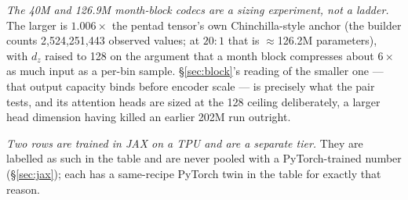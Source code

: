 \documentclass[10pt]{article}
\begin{document}
\emph{The 40M and 126.9M month-block codecs are a sizing experiment, not a
ladder.} The larger is $1.006\times$ the pentad tensor's own Chinchilla-style
anchor (the builder counts 2{,}524{,}251{,}443 observed values; at $20{:}1$
that is $\approx$126.2M parameters), with $d_z$ raised to 128 on the argument
that a month block compresses about $6\times$ as much input as a per-bin
sample. \S\ref{sec:block}'s reading of the smaller one --- that output capacity
binds before encoder scale --- is precisely what the pair tests, and its
attention heads are sized at the 128 ceiling deliberately, a larger head
dimension having killed an earlier 202M run outright.

\emph{Two rows are trained in JAX on a TPU and are a separate tier.} They are
labelled as such in the table and are never pooled with a PyTorch-trained
number (\S\ref{sec:jax}); each has a same-recipe PyTorch twin in the table for
exactly that reason.
\end{document}
